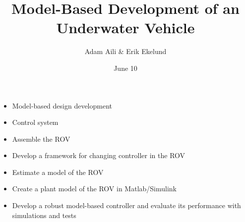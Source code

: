 \documentclass[11pt]{beamer}
\author{Adam Aili \& Erik Ekelund}
\title{Model-Based Development of an Underwater Vehicle}
\date{June 10}
\begin{document}
\begin{frame}
\titlepage
\end{frame}
\begin{frame}
\begin{itemize}
\item Model-based design development
\item Control system
\end{itemize}
\end{frame}

\begin{frame}
\begin{itemize}
\item Assemble the ROV
\item Develop a framework for changing controller in the ROV
\item Estimate a model of the ROV
\item Create a plant model of the ROV in Matlab/Simulink
\item Develop a robust model-based controller and evaluate its performance with simulations and tests
\end{itemize}
\end{frame}


\end{document}
